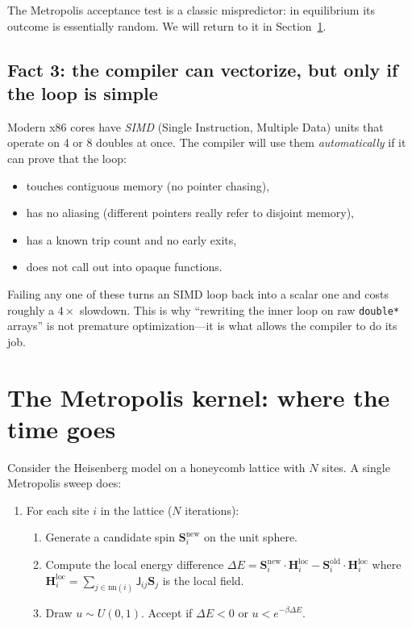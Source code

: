 \documentclass[11pt,letterpaper]{article}
\begin{document}
The Metropolis acceptance test is a classic mispredictor: in equilibrium
its outcome is essentially random.  We will return to it in
Section~\ref{sec:metropolis}.

\subsection{Fact 3: the compiler can vectorize, but only if the loop is simple}
Modern x86 cores have \emph{SIMD} (Single Instruction, Multiple Data)
units that operate on 4 or 8 doubles at once.  The compiler will use them
\emph{automatically} if it can prove that the loop:
\begin{itemize}[noitemsep]
  \item touches contiguous memory (no pointer chasing),
  \item has no aliasing (different pointers really refer to disjoint memory),
  \item has a known trip count and no early exits,
  \item does not call out into opaque functions.
\end{itemize}
Failing any one of these turns an SIMD loop back into a scalar one and
costs roughly a $4\times$ slowdown.  This is why ``rewriting the inner
loop on raw \texttt{double*} arrays'' is not premature
optimization---it is what allows the compiler to do its job.

\section{The Metropolis kernel: where the time goes}
\label{sec:metropolis}

Consider the Heisenberg model on a honeycomb lattice with $N$ sites.
A single Metropolis sweep does:

\begin{enumerate}[noitemsep]
  \item For each site $i$ in the lattice (\(N\) iterations):
  \begin{enumerate}[noitemsep]
    \item Generate a candidate spin $\mathbf{S}_i^{\text{new}}$ on the unit
          sphere.
    \item Compute the local energy difference
          $\Delta E = \mathbf{S}_i^{\text{new}} \cdot \mathbf{H}_i^{\text{loc}}
                    - \mathbf{S}_i^{\text{old}} \cdot \mathbf{H}_i^{\text{loc}}$
          where $\mathbf{H}_i^{\text{loc}} = \sum_{j \in \text{nn}(i)} \mathsf{J}_{ij} \mathbf{S}_j$
          is the local field.
    \item Draw $u \sim U(0,1)$.  Accept if $\Delta E < 0$ or
          $u < e^{-\beta \Delta E}$.
  \end{enumerate}
\end{enumerate}
\end{document}
